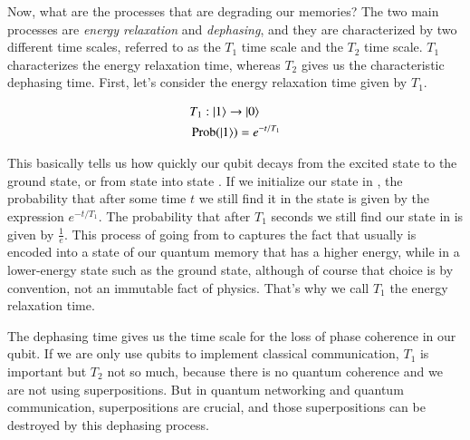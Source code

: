 Now, what are the processes that are degrading our memories? The two main processes are \emph{energy relaxation} and \emph{dephasing}, and they are characterized by two different time scales, referred to as the $T_1$ time scale and the $T_2$ time scale.  $T_1$ characterizes the energy relaxation time, whereas $T_2$ gives us the characteristic dephasing time. First, let's consider the energy relaxation time given by $T_1$.

\begin{equation}
\begin{aligned}
&T_1:|1\rangle \rightarrow|0\rangle \\
&\operatorname{Prob}(\left| 1 \right\rangle)=e^{-t / T_1}
\end{aligned}
\end{equation}

This basically tells us how quickly our qubit decays from the excited state to the ground state, or from state  into state . If we initialize our state in , the probability that after some time $t$ we still find it in the state  is given by the expression $e^{-t/T_1}$. The probability that after $T_1$ seconds we still find our state in  is given by $\frac{1}{e}$. This process of going from  to  captures the fact that usually  is encoded into a state of our quantum memory that has a higher energy, while  in a lower-energy state such as the ground state, although of course that choice is by convention, not an immutable fact of physics.  That's why we call $T_1$ the energy relaxation time.

The dephasing time gives us the time scale for the loss of phase coherence in our qubit. If we are only use qubits to implement classical communication,  $T_1$ is important but  $T_2$ not so much, because there is no quantum coherence and we are not using superpositions. But in quantum networking and quantum communication, superpositions are crucial, and those superpositions can be destroyed by this dephasing process.

